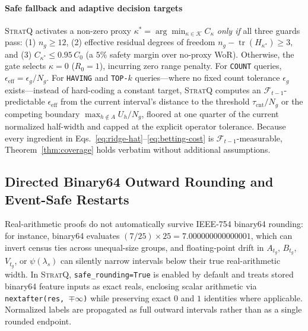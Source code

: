 \paragraph{Safe fallback and adaptive decision targets}
\textsc{StratQ} activates a non-zero proxy $\kappa^* = \arg\min_{\kappa \in \mathcal{K}} C_\kappa$ \emph{only if} all three guards pass: (1) $n_g \ge 12$, (2) effective residual degrees of freedom $n_g - \operatorname{tr}(H_{\kappa^*}) \ge 3$, and (3) $C_{\kappa^*} \le 0.95\,C_0$ (a $5\%$ safety margin over no-proxy WoR).
Otherwise, the gate selects $\kappa = 0$ ($R_0 = 1$), incurring zero range penalty.
For \texttt{COUNT} queries, $\epsilon_{\text{eff}} = \epsilon_g / N_g$.
For \texttt{HAVING} and \texttt{TOP-$k$} queries---where no fixed count tolerance $\epsilon_g$ exists---instead of hard-coding a constant target, \textsc{StratQ} computes an $\mathcal{F}_{t-1}$-predictable $\epsilon_{\text{eff}}$ from the current interval's distance to the threshold $\tau_{\text{cnt}}/N_g$ or the competing boundary $\max_{h \notin A} U_h / N_g$, floored at one quarter of the current normalized half-width and capped at the explicit operator tolerance.
Because every ingredient in Eqs.~\eqref{eq:ridge-hat}--\eqref{eq:betting-cost} is $\mathcal{F}_{t-1}$-measurable, Theorem~\ref{thm:coverage} holds verbatim without additional assumptions.

\subsection{Directed Binary64 Outward Rounding and Event-Safe Restarts}
\label{sec:fp64}

Real-arithmetic proofs do not automatically survive IEEE-754 binary64 rounding: for instance, binary64 evaluates $(7/25)\times 25 = 7.000000000000001$, which can invert census ties across unequal-size groups, and floating-point drift in $A_{t_g}$, $B_{t_g}$, $V_{t_g}$, or $\psi(\lambda_s)$ can silently narrow intervals below their true real-arithmetic width.
In \textsc{StratQ}, \texttt{safe\_rounding=True} is enabled by default and treats stored binary64 feature inputs as exact reals, enclosing scalar arithmetic via \texttt{nextafter(res, $\mp\infty$)} while preserving exact $0$ and $1$ identities where applicable. Normalized labels are propagated as full outward intervals rather than as a single rounded endpoint.

